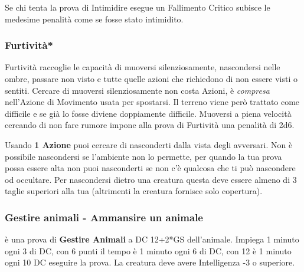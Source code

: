\begin{multicols}{2}
Se chi tenta la prova di Intimidire esegue un Fallimento Critico subisce le medesime penalità come se fosse stato intimidito.


%

\titlespacing*{\subsubsection}{0pt}{0.5em}{0.5em}\subsubsection*{Furtività*}  \label{furtivita}

Furtività raccoglie le capacità di muoversi silenziosamente, nascondersi nelle ombre, passare non visto e tutte quelle azioni che richiedono di non essere visti o sentiti.
Cercare di muoversi silenziosamente non costa Azioni, è \emph{compresa} nell'Azione di Movimento usata per spostarsi. Il terreno viene però trattato come difficile e se già lo fosse diviene doppiamente difficile. Muoversi a piena velocità cercando di non fare rumore impone alla prova di Furtività una penalità di 2d6.

Usando \textbf{1 Azione} puoi cercare di nasconderti dalla vista degli avversari. Non è possibile nascondersi se l'ambiente non lo permette, per quando la tua prova possa essere alta non puoi nasconderti se non c'è qualcosa che ti può nascondere od occultare. Per nascondersi dietro una creatura questa deve essere almeno di 3 taglie superiori alla tua (altrimenti la creatura fornisce solo copertura).

\titlespacing*{\subsubsection}{0pt}{0.5em}{0.5em}\subsubsection*{Gestire animali - Ammansire un animale}\label{gestireanimali}
è una prova di \textbf{Gestire Animali} a DC 12+2*GS dell'animale. Impiega 1 minuto ogni 3 di DC, con 6 punti il tempo è 1 minuto ogni 6 di DC, con 12 è 1 minuto ogni 10 DC eseguire la prova. La creatura deve avere Intelligenza -3 o superiore.


\end{multicols}
